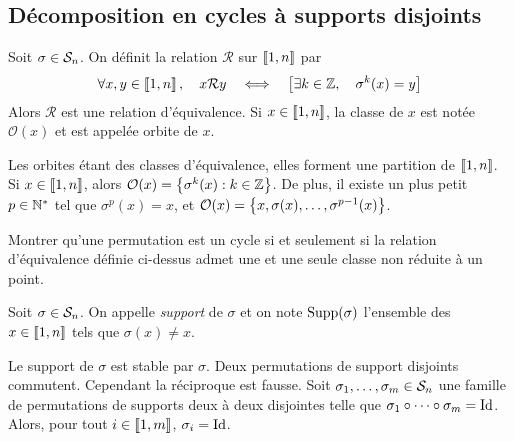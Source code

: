 \documentclass{magnolia}
\begin{document}

\subsection{Décomposition en cycles à supports disjoints}

\begin{definition}
Soit $\sigma\in\mathcal{S}_{n}$. On définit la relation $\mathcal{R}$ sur
$\left\llbracket 1,n\right\rrbracket$ par
\[\forall x,y\in\left\llbracket 1,n\right\rrbracket ,\quad x\mathcal{R}y \quad\Longleftrightarrow\quad
  \left[\exists k\in\mathbb{Z} ,\quad \sigma^k(x)=y\right]\]
Alors $\mathcal{R}$ est une relation d'équivalence. Si $x\in\left\llbracket 1,n\right\rrbracket$, la
classe de $x$ est notée $\mathcal{O}(x)$ et est appelée orbite de $x$.
\end{definition}

\begin{remarques}
\remarque Les orbites étant des classes d'équivalence, elles forment une
  partition de $\left\llbracket 1,n\right\rrbracket$.
\remarque Si $x\in\left\llbracket 1,n\right\rrbracket$, alors
  $\mathcal{O}(x)=\left\{\sigma^k(x) : k\in\mathbb{Z}\right\}$. De plus, il existe
  un plus petit $p\in{\mathbb{N}^*}$ tel que $\sigma^p(x)=x$, et
  $\mathcal{O}(x)=\left\{x,\sigma(x),\ldots,\sigma^{p-1}(x)\right\}$.
\end{remarques}


\begin{exoUnique}
\exo Montrer qu'une permutation est un cycle si et seulement si la
  relation d'équivalence définie ci-dessus admet une et une seule classe
  non réduite à un point.
\end{exoUnique}

\begin{definition}
Soit $\sigma\in\mathcal{S}_{n}$. On appelle \emph{support} de $\sigma$ et on note
$\operatorname{Supp}(\sigma)$ l'ensemble des $x\in\left\llbracket 1,n\right\rrbracket$ tels que $\sigma(x)\neq x$.
\end{definition}

\begin{remarques}
\remarque Le support de $\sigma$ est stable par $\sigma$.
\remarque Deux permutations de support disjoints commutent. Cependant la
  réciproque est fausse.
\remarque Soit $\sigma_1,\ldots,\sigma_m\in\mathcal{S}_{n}$ une famille de
  permutations de supports deux à deux disjointes telle que
  $\sigma_1 \circ \cdots \circ \sigma_m=\operatorname{Id}$. Alors, pour tout
  $i\in\left\llbracket 1,m\right\rrbracket$, $\sigma_i=\operatorname{Id}$.
\end{remarques}
\end{document}
